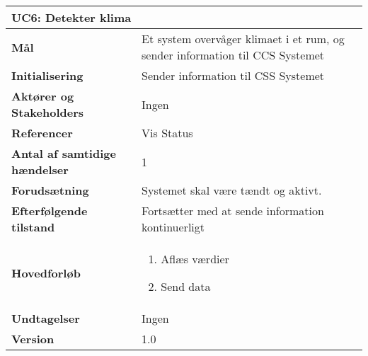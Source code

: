 \begin{table}[H] \centering
\begin{tabular}{|p{6cm}|p{8cm}|}
	\hline
\multicolumn{2}{|l|}{\textbf{UC6: Detekter klima}} \\\hline
\textbf{Mål} &
Et system overvåger klimaet i et rum, og sender information til CCS Systemet  \\\hline

\textbf{Initialisering} &
Sender information til CSS Systemet \\\hline
 
\textbf{Aktører og Stakeholders} &
Ingen \\\hline

\textbf{Referencer} &
Vis Status \\\hline

\textbf{Antal af samtidige hændelser} &
1 \\\hline

\textbf{Forudsætning} &
Systemet skal være tændt og aktivt. \\\hline

\textbf{Efterfølgende tilstand} &
Fortsætter med at sende information kontinuerligt \\\hline

\textbf{Hovedforløb} &
\begin{enumerate}

\item Aflæs værdier
\item Send data
\end{enumerate}   
 \\\hline
 
\textbf{Undtagelser} &Ingen \\\hline
		\textbf{Version}		&1.0 \\\hline
	\end{tabular}
	\label{UC6} 
\end{table}